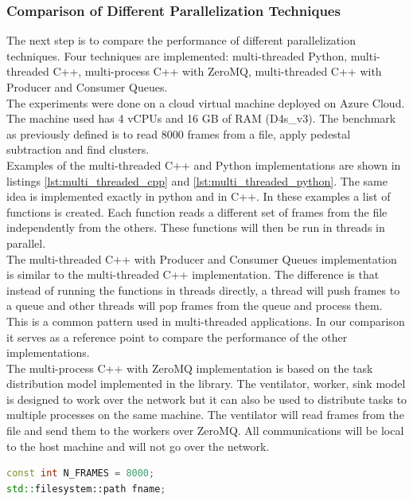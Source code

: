 \begin{spacing}{1.2}
    \subsubsection{Comparison of Different Parallelization Techniques}
    The next step is to compare the performance of different parallelization techniques. Four techniques are
    implemented: multi-threaded Python, multi-threaded C++, multi-process C++ with ZeroMQ, multi-threaded C++ with
    Producer and Consumer Queues.\\

    The experiments were done on a cloud virtual machine deployed on Azure Cloud. The machine used has  4 vCPUs and 16
    GB of RAM (D4s\_v3). The benchmark as previously defined is to read 8000 frames from a file, apply pedestal subtraction and
    find clusters.    \\

    Examples of the multi-threaded C++ and Python implementations are shown in listings \ref{lst:multi_threaded_cpp} and
    \ref{lst:multi_threaded_python}. The same idea is implemented exactly in python and in C++. In these examples
    a list of functions is created. Each function reads a different set of frames from the file independently from
    the others. These functions will then be run in threads in parallel.\\

    The multi-threaded C++ with Producer and Consumer Queues implementation is similar to the multi-threaded C++ implementation.
    The difference is that instead of running the functions in threads directly, a thread will push frames to a queue and
    other threads will pop frames from the queue and process them. This is a common pattern used in multi-threaded applications.
    In our comparison it serves as a reference point to compare the performance of the other implementations.\\

    The multi-process C++ with ZeroMQ implementation is based on the task distribution model implemented in the library.
    The ventilator, worker, sink model is designed to work over the network but it can also be used to distribute tasks
    to multiple processes on the same machine. The ventilator will read frames from the file and send them to the workers
    over ZeroMQ. All communications will be local to the host machine and will not go over the network.\\


    \begin{lstlisting}[language=C++, caption=Multi-threaded C++ example, label=lst:multi_threaded_cpp]
const int N_FRAMES = 8000;
std::filesystem::path fname;


\end{lstlisting}
\end{spacing}
